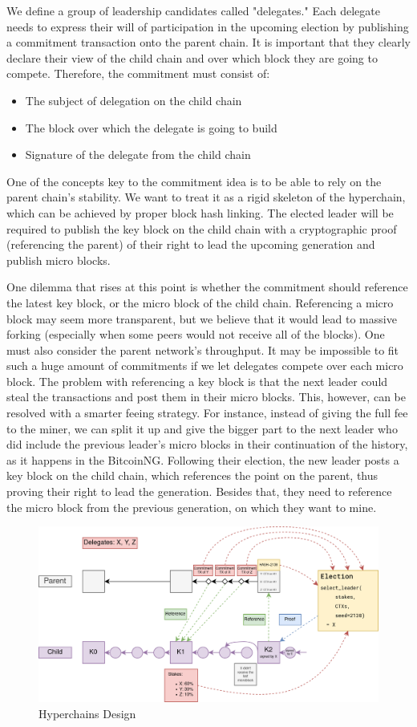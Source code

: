 We define a group of leadership candidates called "delegates." Each delegate
needs to express their will of participation in the upcoming election
by publishing a commitment transaction onto the parent chain. It is
important that they clearly declare their view of the child chain and over which
block they are going to compete.
Therefore, the commitment must consist of:
\begin{itemize}
\item The subject of delegation on the child chain
\item The block over which the delegate is going to build
\item Signature of the delegate from the child chain
\end{itemize}

One of the concepts key to the commitment idea is to be able to rely on
the parent chain's stability. We want to treat it as a rigid skeleton
of the hyperchain, which can be achieved by proper block hash linking. The
elected leader will be required to publish the key block on the child chain with a
cryptographic proof (referencing the parent) of their right to lead the
upcoming generation and publish micro blocks.

One dilemma that rises at this point is whether the commitment should reference
the latest key block, or the micro block of the child chain. Referencing a micro block
may seem more transparent, but we believe that it would
lead to massive forking (especially when some peers would not receive all of the
blocks). One must also consider the parent network's throughput. It may be
impossible to fit such a huge amount of commitments if we let delegates compete
over each micro block.
The problem with referencing a key block is that the next leader could
steal the transactions and post them in their micro blocks. This, however, can be
resolved with a smarter feeing strategy. For instance, instead of giving the full fee to the
miner, we can split it up and give the bigger part to the next leader who did
include the previous leader's micro blocks in their continuation of the history,
as it happens in the BitcoinNG\cite{incentive_bcng}.
Following their election, the new leader posts a key block on the child chain, which
references the point on the parent, thus proving their right to lead the
generation. Besides that, they need to reference the micro block from the previous
generation, on which they want to mine.


\begin{figure}[h]
	\caption{Hyperchains Design}
	\centering
	\includegraphics[scale=0.4]{hyperchains_design}
\end{figure}

